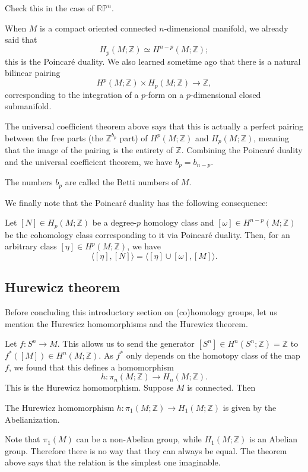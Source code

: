 \documentclass[12pt]{article}
\numberwithin{equation}{section}
\theoremstyle{remark}
\def\bZ{\mathbb{Z}}
\def\RP{\mathbb{RP}}
\begin{document}
\begin{question}
Check this in the case of $\RP^n$.
\end{question}

When $M$ is a compact oriented connected $n$-dimensional manifold,
we already said that 
\begin{equation}
  H_p(M;\bZ)\simeq H^{n-p}(M;\bZ); \label{eq:pd}
\end{equation}
this is the Poincar\'e duality.
We also learned sometime ago that there is a natural bilinear pairing 
\begin{equation}
H^p(M;\bZ)\times H_p(M;\bZ) \to \bZ,
\end{equation}
corresponding to the integration of a $p$-form on a $p$-dimensional closed submanifold.

The universal coefficient theorem above says that
this is actually a perfect pairing between the free parts (the $\bZ^{b_p}$ part) of $H^p(M;\bZ)$ and $H_p(M;\bZ)$,
meaning that the image of the pairing is the entirety of $\bZ$.
Combining the Poincar\'e duality and the universal coefficient theorem,
we have $b_p=b_{n-p}$.
\begin{definition}
  The numbers $b_p$ are called the Betti numbers of $M$.
\end{definition}

We finally note that the Poincar\'e duality has the following consequence:
\begin{proposition}
  Let $[N]\in H_p(M;\bZ)$ 
  be a degree-$p$ homology class and $[\omega]\in H^{n-p}(M;\bZ)$ 
  be the cohomology class corresponding to it via Poincar\'e duality.
  Then, for an arbitrary class $[\eta]\in H^p(M;\bZ)$,
  we have \begin{equation}
    \langle [\eta],[N]\rangle = \langle [\eta]\cup [\omega],[M]\rangle.
  \end{equation}  
\end{proposition}

\subsection{Hurewicz theorem}

Before concluding this introductory section on (co)homology groups,
let us mention the Hurewicz homomorphisms and the Hurewicz theorem.

Let $f:S^n\to M$. This allows us to send the generator $[S^n] \in H^n(S^n;\bZ)=\bZ$ to $f^*([M])\in H^n(M;\bZ)$.
As $f^*$ only depends on the homotopy class of the map $f$, 
we found that this defines a homomorphism \begin{equation}
  h:\pi_n(M;\bZ)\to H_n(M;\bZ).
\end{equation}
This is the Hurewicz homomorphism.
Suppose $M$ is connected. Then 
\begin{theorem}
  The Hurewicz homomorphism $h:\pi_1(M;\bZ)\to H_1(M;\bZ)$ is given by the Abelianization.
\end{theorem}
Note that $\pi_1(M)$ can be a non-Abelian group,
while $H_1(M;\bZ)$ is an Abelian group.
Therefore there is no way that they can always be equal.
The theorem above says that the relation is the simplest one imaginable.
\end{document}
